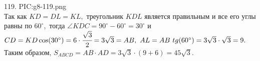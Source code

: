 119. {{PIC:g8-119.png}}\\
Так как $KD=DL=KL,$ треугольник $KDL$ является правильным и все его углы равны по $60^\circ,$ тогда $\angle KDC=90^\circ-60^\circ=30^\circ$ и $CD=KD\cos(30^\circ)=6\cdot\cfrac{\sqrt{3}}{2}=3\sqrt{3}=AB,\ AL=AB\ tg(60^\circ)=3\sqrt{3}\cdot\sqrt{3}=9.$ Таким образом, $S_{ABCD}=AB\cdot AD=3\sqrt{3}\cdot(9+6)=45\sqrt{3}.$\\
